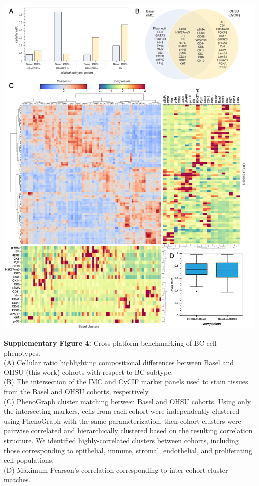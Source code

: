 \documentclass[preprint,review,3p,12pt]{elsarticle}
\begin{document}
\begin{suppfigure}[p]
\centering\includegraphics[width=\linewidth,
                 keepaspectratio]{suppfig4_secondrevision}
\caption{}
\label{fig:suppfig4}
\end{suppfigure}

\newpage

\noindent
\textbf{Supplementary Figure 4:} Cross-platform benchmarking of BC cell phenotypes.\\
(A) Cellular ratio highlighting compositional differences between Basel \cite{jackson_single-cell_2020} and OHSU (this work) cohorts with respect to BC subtype.\\
(B) The intersection of the IMC and CyCIF marker panels used to stain tissues from the Basel and OHSU cohorts, respectively.\\
(C) PhenoGraph cluster matching between Basel and OHSU cohorts. Using only the intersecting markers, cells from each cohort were independently clustered using PhenoGraph with the same parameterization, then cohort clusters were pairwise correlated and hierarchically clustered based on the resulting correlation structure. We identified highly-correlated clusters between cohorts, including those corresponding to epithelial, immune, stromal, endothelial, and proliferating cell populations.\\
(D) Maximum Pearson's correlation corresponding to inter-cohort cluster matches.
\end{document}
